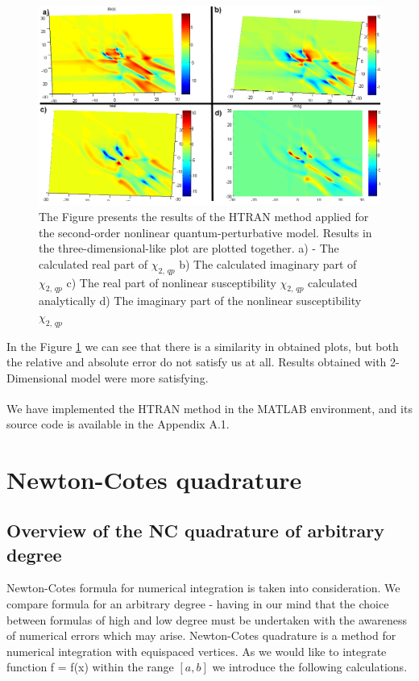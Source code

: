 \documentclass[12pt,twoside,a4paper]{article}
\numberwithin{equation}{subsection}
\numberwithin{figure}{subsection}
\begin{document}
\begin{figure}
  \includegraphics[width=150mm]{img/htran_qp_3d.png}
  \caption{The Figure presents the results of the HTRAN method applied for the second-order nonlinear quantum-perturbative model. Results
  in the three-dimensional-like plot are plotted together.
     a) - The calculated real part of ${\chi_{2, \,qp}}$ 
     b) The calculated imaginary part of ${\chi_{2, \,qp}}$ 
     c) The real part of nonlinear susceptibility ${\chi_{2, \,qp}}$ calculated analytically 
     d) The imaginary part of the nonlinear susceptibility ${\chi_{2, \,qp}}$
     \label{fig:htran_qp_3d}}
\end{figure}

In the Figure \ref{fig:htran_qp_3d} we can see that there is a similarity in obtained plots, but both the relative and absolute
error do not satisfy us at all. Results obtained with 2-Dimensional model were more satisfying.

We have implemented the HTRAN method in the MATLAB \textsuperscript{\textregistered} environment, and its source code is available in
the Appendix A.1.




\section{Newton-Cotes quadrature} \label{chap:nc}

\subsection{Overview of the NC quadrature of arbitrary degree}  \label{chap:nc_quadrature}

Newton-Cotes formula for numerical integration is taken into consideration. We compare formula for an arbitrary degree - having in
our mind that the choice between formulas of high and low degree must be undertaken with the awareness of numerical errors which
may arise. Newton-Cotes quadrature is a method for numerical integration with equispaced vertices. As we would like to integrate
function f = f(x) within the range $[a, b]$ we introduce the following calculations.
\end{document}

